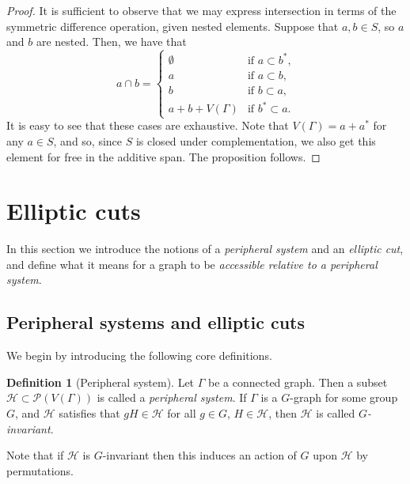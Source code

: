 \documentclass[11pt,a4paper]{amsart}
\theoremstyle{definition}
\newtheorem{definition}[theorem]{Definition}
\newcommand{\per}{\mathcal{H}}
\begin{document}
\begin{proof}
    It is sufficient to observe that we may express intersection in terms of the symmetric difference operation, given nested elements. Suppose that $a,b \in S$, so $a$ and $b$ are nested. Then, we have that
    $$
    a\cap b = \begin{cases}
        \emptyset &\text{if $a \subset b^\ast$,}\\
        a &\text{if $a \subset b$,}\\
        b &\text{if $b \subset a$,}\\
        a + b + V(\Gamma) &\text{if $b^\ast \subset a$.}
    \end{cases}
    $$
    It is easy to see that these cases are exhaustive. Note that $V(\Gamma) = a + a^\ast$ for any $a \in S$, and so, since $S$ is closed under complementation, we also get this element for free in the additive span. The proposition follows.
\end{proof}




\section{Elliptic cuts}

In this section we introduce the notions of a \emph{peripheral system} and an \emph{elliptic cut}, and define what it means for a graph to be \emph{accessible relative to a peripheral system}. 




\subsection{Peripheral systems and elliptic cuts}

We begin by introducing the following core definitions.

\begin{definition}[Peripheral system]
    Let $\Gamma$ be a connected graph. Then a subset $\per \subset \mathscr P(V(\Gamma))$ is called a \emph{peripheral system}. 
    If $\Gamma$ is a $G$-graph for some group $G$, and $\per$ satisfies that $g H \in \per$ for all $g \in G$, $H \in \per$, then $\per$ is called \emph{$G$-invariant}. 
\end{definition}

Note that if $\per$ is $G$-invariant then this induces an action of $G$ upon $\per$ by permutations.
\end{document}
